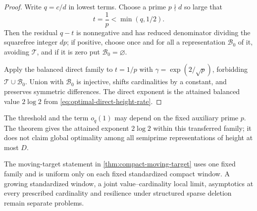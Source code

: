 \begin{proof}
Write $q=c/d$ in lowest terms.  Choose a prime $p\nmid d$ so large that
\[
 t=\frac1p<\min(q,1/2).
\]
Then the residual $q-t$ is nonnegative and has reduced denominator dividing the squarefree integer $dp$; if positive, choose once and for all a representation $\mathcal B_0$ of it, avoiding $\mathcal T$, and if it is zero put $\mathcal B_0=\varnothing$.

Apply the balanced direct family to $t=1/p$ with $\gamma=\exp(2/\sqrt p)$, forbidding $\mathcal T\cup\mathcal B_0$.  Union with $\mathcal B_0$ is injective, shifts cardinalities by a constant, and preserves symmetric differences.  The direct exponent is the attained balanced value $2\log2$ from \cref{eq:optimal-direct-height-rate}.
\end{proof}

The threshold and the term $o_q(1)$ may depend on the fixed auxiliary prime $p$.  The theorem gives the attained exponent $2\log2$ within this transferred family; it does not claim global optimality among all semiprime representations of height at most $D$.

\begin{remark}
The moving-target statement in \cref{thm:compact-moving-target} uses one fixed family and is uniform only on each fixed standardized compact window.  A growing standardized window, a joint value--cardinality local limit, asymptotics at every prescribed cardinality and resilience under structured sparse deletion remain separate problems.
\end{remark}
